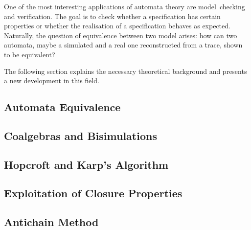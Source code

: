     One of the most interesting applications of automata theory are model~checking and verification.
    The goal is to check whether a specification has certain properties
    or whether the realisation of a specification behaves as expected.
    Naturally, the question of equivalence between two model arises:
    how can two automata, maybe a simulated and a real one reconstructed from a trace,
    shown to be equivalent?

    The following section explains the necessary theoretical background and presents a
    new development in this field.

    \subsection{Automata Equivalence}
    

    \subsection{Coalgebras and Bisimulations}
    

    \subsection{Hopcroft and Karp's Algorithm}
    

    \subsection{Exploitation of Closure Properties}

    \subsection{Antichain Method}

